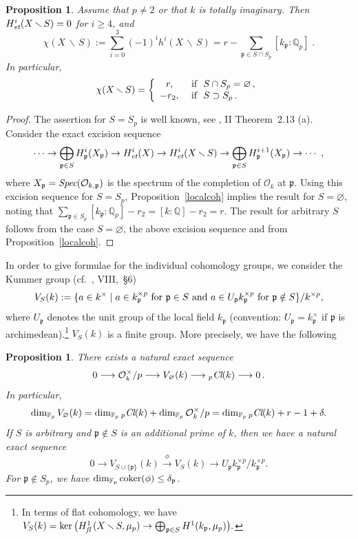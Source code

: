 \documentclass[10pt]{article}
\newcommand{\Spec}{\text{\it Spec}}
\newcommand{\Q}{{\mathbb Q}}
\newcommand{\F}{{\mathbb F}}
\renewcommand{\O}{{\mathcal{O}}}
\newcommand{\Cl}{\text{\it Cl}}
\newcommand{\p}{{\mathfrak p}}
\newcommand{\sm}{{\,\smallsetminus\,}}
\newcommand{\et}{\text{\it et}}
\newcommand{\fl}{\text{\it fl}\,}
\newcommand{\coker}{\text{\rm coker}}
\theoremstyle{alex}
\newtheorem{proposition}[theorem]{Proposition}
\theoremstyle{alexdef}
\begin{document}
\begin{proposition}\label{globalchi}
Assume that $p\neq 2$ or that $k$ is totally imaginary.
Then $H^i_\et(X\sm S)=0$ for\/ $i\geq 4$, and
\[
\chi(X\sm S):= \sum_{i=0}^3 (-1)^i h^i(X\sm S)= r - \sum_{\p \in S\cap S_p} [k_\p:\Q_p]\;.
\]
In particular,
\[
\chi(X\sm S)=\left\{
\begin{array}{cl}
r, & \hbox{ if }\ S\cap S_p=\varnothing\,,\\
-r_2, & \hbox{ if }\ S\supset S_p\, .
\end{array}
\right.
\]
\end{proposition}

\begin{proof}
The assertion for $S=S_p$ is well known, see \cite{Mi}, II Theorem~2.13 (a). Consider the exact excision sequence
\[
\cdots \to \bigoplus_{\p \in S} H^i_\p(X_\p) \to H^i_\et(X) \to H^i_\et (X\sm S) \to \bigoplus_{\p \in S} H^{i+1}_\p(X_\p) \to \cdots \ ,
\]
where $X_\p=\Spec(\O_{k,\p})$ is the spectrum of the completion of $\O_k$ at $\p$. Using this excision sequence for $S=S_p$, Proposition~\ref{localcoh} implies the result for $S=\varnothing$, noting that $\sum_{\p \in S_p}[k_\p:\Q_p]-r_2=[k:\Q]-r_2=r$. The result for arbitrary $S$ follows from the case $S=\varnothing$, the above excision sequence and from Proposition~\ref{localcoh}.
\end{proof}

In order to give formulae for the individual cohomology groups, we consider the Kummer group
 (cf.\ \cite{NSW}, VIII,\, \S 6)
\[
V_S(k):=\{ a \in k^\times \mid a \in k_\p^{\times p} \hbox{ for } \p \in S \hbox{ and } a \in U_\p k_\p^{\times p} \hbox{ for } \p \notin S\}/k^{\times p},
\]
where $U_\p$ denotes the unit group of the local field $k_\p$ (convention: $U_\p=k_\p^\times$ if $\p$ is archimedean).\footnote{In terms of flat cohomology, we have
$
V_S(k)= \ker \big(H^1_\fl(X\sm S,\mu_p) \to \bigoplus_{\p \in S} H^1(k_\p,\mu_p)\big).
$}
$V_S(k)$ is a finite group. More precisely, we have the following

\begin{proposition}\label{VSchange}
There exists a natural exact sequence
\[
0\longrightarrow \O_k^\times /p \longrightarrow V_\varnothing(k) \longrightarrow \null_p \Cl(k) \longrightarrow 0\,.
\]
In particular,
\[
\dim_{\F_p} V_\varnothing(k) = \dim_{\F_p} \null_p \Cl(k) + \dim_{\F_p} \O_k^\times /p= \dim_{\F_p} \null_p \Cl(k) + r-1+\delta.
\]
If\/ $S$ is arbitrary and \/ $\p\notin S$ is an additional prime of\/ $k$, then we have a natural exact sequence
\[
0 \longrightarrow V_{S \cup \{\p\}}(k)\stackrel{\phi}{\longrightarrow} V_S(k)  \longrightarrow U_\p k_\p^{\times p}/k_\p^{\times p}.
\]
For $\p\notin S_p$, we have
$
\dim_{\F_p} \coker(\phi)\leq \delta_\p$.
\end{proposition}
\end{document}
